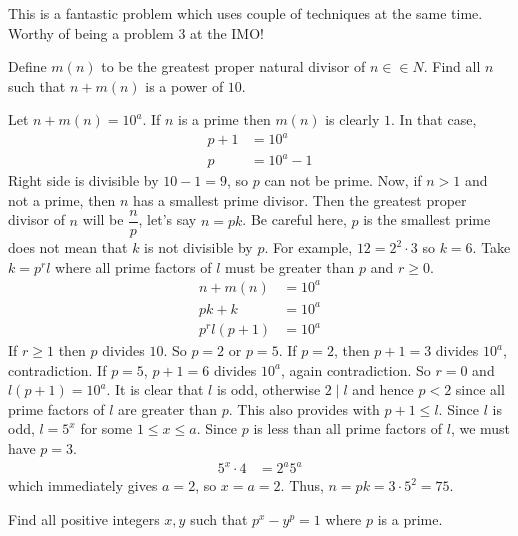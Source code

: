 \documentclass[problems.tex]{subfile}
\begin{document}
	\begin{note}
		This is a fantastic problem which uses couple of techniques at the same time. Worthy of being a problem $3$ at the IMO!
	\end{note}

	\begin{problem}
		Define $m(n)$ to be the greatest proper natural divisor of $n \in\in N$. Find all $n$ such that $n + m(n)$ is a power of $10$.
	\end{problem}

	\begin{solution}
		Let $n+m(n)=10^a$. If $n$ is a prime then $m(n)$ is clearly $1$. In that case,
		\begin{align*}
		p+1 & = 10^a\\
		p & = 10^a-1
		\end{align*}
		Right side is divisible by $10-1=9$, so $p$ can not be prime. Now, if $n>1$ and not a prime, then $n$ has a smallest prime divisor. Then the greatest proper divisor of $n$ will be $\dfrac{n}{p}$, let's say $n=pk$. Be careful here, $p$ is the smallest prime does not mean that $k$ is not divisible by $p$. For example, $12=2^2\cdot3$ so $k=6$. Take $k=p^rl$ where all prime factors of $l$ must be greater than $p$ and $r\geq0$.
		\begin{align*}
		n+m(n) & = 10^a\\
		pk+k & = 10^a\\
		p^rl(p+1) & = 10^a
		\end{align*}
		If $r\geq1$ then $p$ divides $10$. So $p=2$ or $p=5$. If $p=2$, then $p+1=3$ divides $10^a$, contradiction. If $p=5$, $p+1=6$ divides $10^a$, again contradiction. So $r=0$ and $l(p+1)=10^a$. It is clear that $l$ is odd, otherwise $2\mid l$ and hence $p<2$ since all prime factors of $l$ are greater than $p$. This also provides with $p+1\leq l$. Since $l$ is odd, $l=5^x$ for some $1\leq x\leq a$. Since $p$ is less than all prime factors of $l$, we must have $p=3$.
		\begin{align*}
		5^x\cdot4 & = 2^a5^a
		\end{align*}
		which immediately gives $a=2$, so $x=a=2$. Thus, $n=pk=3\cdot5^2=75$.
	\end{solution}

	\begin{problem}
		Find all positive integers $x, y$ such that $p^x - y^p = 1$ where $p$ is a prime.
	\end{problem}
\end{document}
